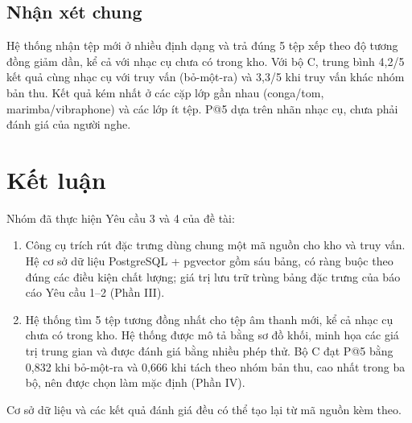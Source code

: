 \documentclass[11pt,a4paper]{article}
\begin{document}
\subsection{Nhận xét chung}
\enlargethispage{2\baselineskip}
Hệ thống nhận tệp mới ở nhiều định dạng và trả đúng 5 tệp xếp theo độ tương đồng giảm dần, kể cả với nhạc cụ chưa có trong kho. Với bộ C, trung bình 4,2/5 kết quả cùng nhạc cụ với truy vấn (bỏ-một-ra) và 3,3/5 khi truy vấn khác nhóm bản thu. Kết quả kém nhất ở các cặp lớp gần nhau (conga/tom, marimba/vibraphone) và các lớp ít tệp. P@5 dựa trên nhãn nhạc cụ, chưa phải đánh giá của người nghe.
\clearpage

\section*{Kết luận}
Nhóm đã thực hiện Yêu cầu 3 và 4 của đề tài:
\begin{enumerate}
\item Công cụ trích rút đặc trưng dùng chung một mã nguồn cho kho và truy vấn. Hệ cơ sở dữ liệu PostgreSQL + pgvector gồm sáu bảng, có ràng buộc theo đúng các điều kiện chất lượng; giá trị lưu trữ trùng bảng đặc trưng của báo cáo Yêu cầu 1--2 (Phần III).
\item Hệ thống tìm 5 tệp tương đồng nhất cho tệp âm thanh mới, kể cả nhạc cụ chưa có trong kho. Hệ thống được mô tả bằng sơ đồ khối, minh họa các giá trị trung gian và được đánh giá bằng nhiều phép thử. Bộ C đạt P@5 bằng 0,832 khi bỏ-một-ra và 0,666 khi tách theo nhóm bản thu, cao nhất trong ba bộ, nên được chọn làm mặc định (Phần IV).
\end{enumerate}
Cơ sở dữ liệu và các kết quả đánh giá đều có thể tạo lại từ mã nguồn kèm theo.
\clearpage
\end{document}
